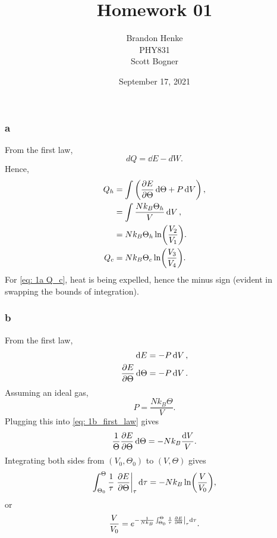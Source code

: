 \documentclass[a4paper,12pt,twoside]{article}
\title{Homework 01}
\author{Brandon Henke\\PHY831\\Scott Bogner}
\date{September 17, 2021}
\begin{document}

\maketitle
\begin{multicols*}{2}


\subsection{}%
\subsubsection*{a}
From the first law,
\begin{equation}
	dQ = \dd{E} - dW.
\end{equation}
Hence,
\begin{align}
	Q_h &= \int \left( \pdv{E}{\Theta} \dd{\Theta} +  P \dd{V}\right),\\
	&= \int \frac{Nk_B\Theta_h}{V}\dd{V},\\
	&= Nk_B\Theta_h \ln(\frac{V_2}{V_1}).
	\label{eq: 1a Q_h}\\
	Q_c &= Nk_B\Theta_c \ln(\frac{V_3}{V_4}).
	\label{eq: 1a Q_c}
\end{align}
For \ref{eq: 1a Q_c}, heat is being expelled, hence the minus sign (evident in swapping the bounds of integration).
\subsubsection*{b}
From the first law,
\begin{align}
	\dd{E} &= -P\dd{V},\\
	\pdv{E}{\Theta}\dd{\Theta} &= -P\dd{V}.
	\label{eq: 1b_first_law}
\end{align}
Assuming an ideal gas,
\begin{equation}
	P = \frac{Nk_B \Theta}{V}.
\end{equation}
Plugging this into \ref{eq: 1b_first_law} gives
\begin{equation}
	\frac{1}{\Theta} \pdv{E}{\Theta} \dd{\Theta} = -Nk_B \frac{\dd{V}}{V}.
\end{equation}
Integrating both sides from $(V_0,\Theta_0)$ to $(V,\Theta)$ gives
\begin{equation}
	\int_{\Theta_0}^\Theta \frac{1}{\tau} \left.\pdv{E}{\Theta}\right|_\tau \dd{\tau} = -Nk_B \ln(\frac{V}{V_0}),
\end{equation}
or
\begin{equation}
	\frac{V}{V_0} = e^{-\frac{1}{Nk_B}\int_{\Theta_0}^\Theta \frac{1}{\tau} \left.\pdv{E}{\Theta}\right|_\tau \dd{\tau}}.
	\label{eq: 1b_answer}
\end{equation}


\end{multicols*}
\end{document}
